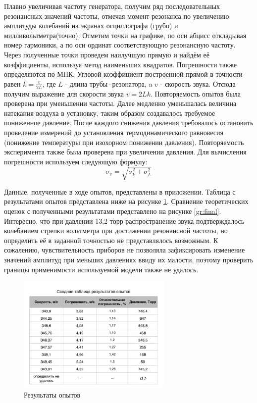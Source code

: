\documentclass[a4paper,12pt]{article}
\begin{document}
Плавно увеличивая частоту генератора, получим ряд последовательных резонансных значений частоты, отмечая момент резонанса по увеличению амплитуды колебаний на экранах осциллографа (грубо) и милливольтметра(точно). Отметим точки на графике, по оси абцисс откладывая номер гармоники, а по оси ординат соответствующую резонансную частоту. Через полученные точки проведем наилучшую прямую и найдём её коэффициенты, используя метод наименьших квадратов. Погрешности также определяются по МНК. Угловой коэффициент построенной прямой в точности равен $k = \frac{v}{2L}$, где $L$ - длина трубы\,-\,резонатора, a $v$ - скорость звука. Отсюда получим выражение для скорости звука $v = 2Lk$. Повторяемость опытов была проверена при уменьшении частоты. Далее медленно уменьшалась величина натекания воздуха в установку, таким образом создавалось требуемое пониженное давление. После каждого снижения давления требовалось остановить проведение измерений до установления термодинамического равновесия (понижение температуры при изохорном понижении давления). Повторяемость эксперимента также была проверена при увеличении давления. Для вычисления погрешности используем следующую формулу:
$$\sigma_v = \sqrt{\sigma_k^2 + \sigma_L^2}$$

Данные, полученные в ходе опытов, представлены в приложении. Таблица с результатами опытов представлена ниже на рисунке \ref{t:final}. Сравнение теоретических оценок с полученными результатами представлено на рисунке \ref{gr:final}. Интересно, что при давлении 13,2 торр распространение звука подтверждалось колебанием стрелки вольтметра при достижении резонансной частоты, но определить её в заданной точностью не представлялось возможным. К сожалению, чувствительность приборов не позволяла зафиксировать изменение значений амплитуд при меньших давлениях ввиду их малости, поэтому проверить границы применимости используемой модели также не удалось.

\begin{figure}[h]
    \centering
    \includegraphics[width=75mm]{t_Final.png}
    \caption{Результаты опытов}
    \label{t:final}
\end{figure}
\end{document}

